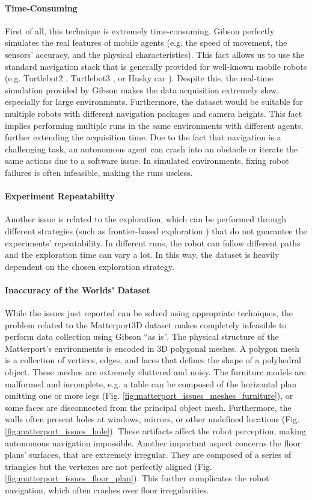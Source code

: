 \paragraph*{Time-Consuming} First of all, this technique is extremely time-consuming. Gibson perfectly simulates the real features of mobile agents (e.g. the speed of movement, the sensors' accuracy, and the physical characteristics). This fact allows us to use the standard navigation stack that is generally provided for well-known mobile robots (e.g. Turtlebot2 \cite{turtlebot2}, Turtlebot3 \cite{turtlebot3}, or Husky car \cite{husky}). Despite this, the real-time simulation provided by Gibson makes the data acquisition extremely slow, especially for large environments.  Furthermore, the dataset would be suitable for multiple robots with different navigation packages and camera heights. This fact implies performing multiple runs in the same environments with different agents, further extending the acquisition time. Due to the fact that navigation is a challenging task, an autonomous agent can crash into an obstacle or iterate the same actions due to a software issue. In simulated environments, fixing robot failures is often infeasible, making the runs useless. 

\paragraph*{Experiment Repeatability} Another issue is related to the exploration, which can be performed through different strategies (such as frontier-based exploration \cite{frontierexploration}) that do not guarantee the experiments' repeatability. In different runs, the robot can follow different paths and the exploration time can vary a lot. In this way, the dataset is heavily dependent on the chosen exploration strategy.

\paragraph*{Inaccuracy of the Worlds' Dataset} While the issues just reported can be solved using appropriate techniques, the problem related to the Matterport3D dataset makes completely infeasible to perform data collection using Gibson ``as is''. The physical structure of the Matterport's environments is encoded in 3D polygonal meshes. A polygon mesh is a collection of vertices, edges, and faces that defines the shape of a polyhedral object. These meshes are extremely cluttered and noisy. The furniture models are malformed and incomplete, e.g. a table can be composed of the horizontal plan omitting one or more legs (Fig. \ref{fig:matterport_issues_meshes_furniture}), or some faces are disconnected from the principal object mesh. Furthermore, the walls often present holes at windows, mirrors, or other undefined locations (Fig. \ref{fig:matterport_issues_hole}). These artifacts affect the robot perception, making autonomous navigation impossible. Another important aspect concerns the floor plans' surfaces, that are extremely irregular. They are composed of a series of triangles but the vertexes are not perfectly aligned (Fig. \ref{fig:matterport_issues_floor_plan}). This further complicates the robot navigation, which often crashes over floor irregularities.

